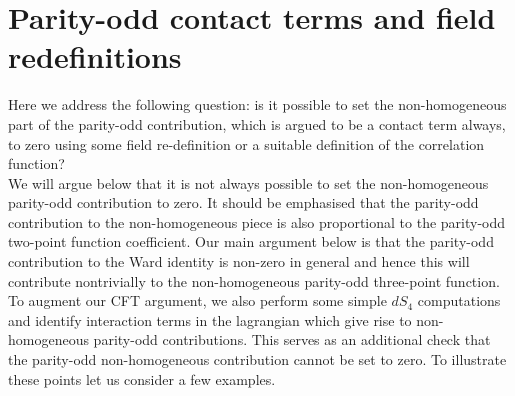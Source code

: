 \documentclass[a4paper,11pt]{article}
\begin{document}
\section{Parity-odd contact terms and field redefinitions}\label{contact}
Here we address the following question: is it possible to set the non-homogeneous part of the parity-odd contribution, which is argued to be a contact term always, to zero using some field re-definition or a suitable definition of the correlation function? 
 \\ 
We will argue below that it is not always possible to set the non-homogeneous parity-odd contribution to zero. It should be emphasised that the parity-odd contribution to the non-homogeneous piece is also proportional to the parity-odd two-point function coefficient. Our main argument below is that the parity-odd contribution to the Ward identity is non-zero in general and hence this will contribute nontrivially to the non-homogeneous parity-odd three-point function. To augment our CFT argument, we also perform some simple $dS_4$ computations and identify interaction terms in the lagrangian which give rise to non-homogeneous parity-odd contributions. This serves as an additional check that the parity-odd non-homogeneous contribution cannot be set to zero. To illustrate these points let us consider a few examples. 
 
\end{document}
